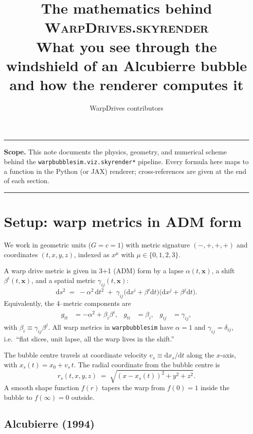 \documentclass[11pt]{article}
\title{The mathematics behind \textsc{WarpDrives.skyrender}\\[0.4em]
\large What you see through the windshield of an Alcubierre bubble\\
and how the renderer computes it}
\author{WarpDrives contributors}
\date{}
\newcommand{\diff}{\mathrm{d}}
\begin{document}
\maketitle
\hrule
\medskip

\noindent
\textbf{Scope.} This note documents the physics, geometry, and numerical scheme
behind the \texttt{warpbubblesim.viz.skyrender*} pipeline.  Every formula here
maps to a function in the Python (or JAX) renderer; cross-references are
given at the end of each section.

\tableofcontents
\medskip\hrule\medskip

\section{Setup: warp metrics in ADM form}

We work in geometric units ($G=c=1$) with metric signature $(-,+,+,+)$ and
coordinates $(t,x,y,z)$, indexed as $x^\mu$ with $\mu\in\{0,1,2,3\}$.

A warp drive metric is given in 3+1 (ADM) form by a lapse $\alpha(t,\bm x)$,
a shift $\beta^i(t,\bm x)$, and a spatial metric $\gamma_{ij}(t,\bm x)$:
\begin{equation}
\diff s^2 \;=\; -\alpha^2\,\diff t^2 \;+\; \gamma_{ij}\bigl(\diff x^i + \beta^i\diff t\bigr)\bigl(\diff x^j + \beta^j\diff t\bigr).
\label{eq:adm}
\end{equation}
Equivalently, the 4--metric components are
\begin{align}
g_{tt} &= -\alpha^2 + \beta_i\beta^i, & g_{ti} &= \beta_i, & g_{ij}&=\gamma_{ij},
\label{eq:gcomp}
\end{align}
with $\beta_i \equiv \gamma_{ij}\beta^j$.  All warp metrics in \texttt{warpbubblesim}
have $\alpha=1$ and $\gamma_{ij}=\delta_{ij}$, i.e.\ ``flat slices, unit lapse, all
the warp lives in the shift.''

The bubble centre travels at coordinate velocity $v_s\equiv \diff x_s/\diff t$
along the $x$-axis, with $x_s(t) = x_0 + v_s\,t$.  The radial coordinate from
the bubble centre is
\begin{equation}
r_s(t,x,y,z) \;=\; \sqrt{(x-x_s(t))^2 + y^2 + z^2}.
\end{equation}
A smooth shape function $f(r)$ tapers the warp from $f(0)\!=\!1$ inside the
bubble to $f(\infty)\!=\!0$ outside.

\subsection*{Alcubierre (1994)}
\end{document}
